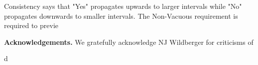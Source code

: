\documentclass[12pt]{article}
\newcommand{\1}{\mathbf{1}} %
\begin{document}
Consistency says that "Yes" propagates upwards to larger intervals while "No" propagates downwards to smaller intervals. The Non-Vacuous requirement is required to previe





\bigskip

\noindent \textbf{Acknowledgements. } We gratefully acknowledge NJ Wildberger for criticisms of 

\begin{thebibliography}{28.}
d

\end{thebibliography}
\end{document}
